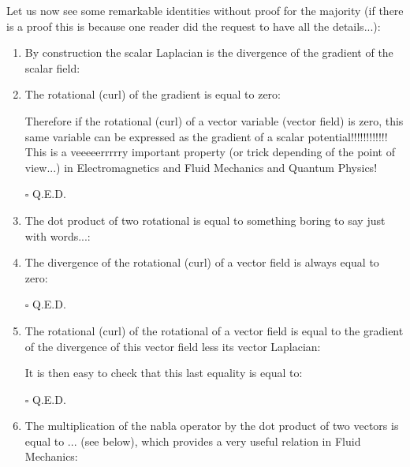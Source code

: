 	Let us now see some remarkable identities without proof for the majority (if there is a proof this is because one reader did the request to have all the details...):
	\begin{enumerate}
		\item By construction the scalar Laplacian is the divergence of the gradient of the scalar field:
		
		
		\item The rotational (curl) of the gradient is equal to zero:
		
		Therefore if the rotational (curl) of a vector variable (vector field) is zero, this same variable can be expressed as the gradient of a scalar potential!!!!!!!!!!!! This is a veeeeerrrrry important property (or trick depending of the point of view...) in Electromagnetics and Fluid Mechanics and Quantum Physics!
		\begin{dem}
		
		\begin{flushright}
			$\square$  Q.E.D.
		\end{flushright}
		\end{dem}
		
		\item The dot product of two rotational is equal to something boring to say just with words...:
		
		
		\item The divergence of the rotational (curl) of a vector field is always equal to zero:
		
		\begin{dem}
		
		\begin{flushright}
			$\square$  Q.E.D.
		\end{flushright}
		\end{dem}
		
		\item The rotational (curl) of the rotational  of a vector field is equal to the gradient of the divergence of this vector field less its vector Laplacian:
		
		\begin{dem}
		
		It is then easy to check that this last equality is equal to:
		
		\begin{flushright}
			$\square$  Q.E.D.
		\end{flushright}
		\end{dem}
		
		\item The multiplication of the nabla operator by the dot product of two vectors is equal to ... (see below), which provides a very useful relation in Fluid Mechanics:
		

\end{enumerate}
